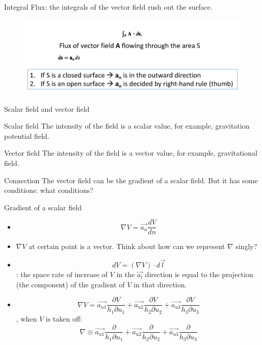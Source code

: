 \documentclass[xcolor={dvipsnames}]{beamer}
\begin{document}
\begin{frame}{Integral}
Flux: the integrals of the vector field rush out the surface.
\begin{figure}[H]
	\centering
	\includegraphics[width=0.7\linewidth]{2_1.png}
\end{figure}
\end{frame}
\begin{frame}{Scalar field and vector field}

\begin{block}{Scalar field}
The intensity of the field is a scalar value, for example, gravitation potential field.
\end{block}
\pause
\begin{block}{Vector field}
The intensity of the field is a vector value, for example, gravitational field.
\end{block}
\pause
\begin{block}{Connection}
The vector field can be the gradient of a scalar field. But it has some conditions: what conditions?
\end{block}
\end{frame}
\begin{frame}{Gradient of a scalar field}

\begin{itemize}
    \item $$\nabla V = \vec{a_n} \frac{dV}{dn}$$
    \item $\nabla V$ at certain point is a vector. Think about how can we represent $\nabla$ singly?
    \item $$dV = (\nabla V)\cdot d\vec{l}$$: the space rate of increase of $V$ in the $\vec{a_l}$ direction is equal to the projection (the component) of the gradient of $V$ in that direction. 
    \item $$
        \nabla V = \vec{a_{u1}} \frac{\partial V}{h_1\partial u_1} + \vec{a_{u2}}\frac{\partial V}{h_2\partial u_2} + \vec{a_{u3}} \frac{\partial V}{h_3\partial u_3}
    $$, when $V$ is taken off:
    $$
    \nabla \equiv  \vec{a_{u1}} \frac{\partial }{h_1\partial u_1} + \vec{a_{u2}}\frac{\partial }{h_2\partial u_2} + \vec{a_{u3}} \frac{\partial }{h_3\partial u_3}
    $$
\end{itemize}
\end{frame}
\end{document}
